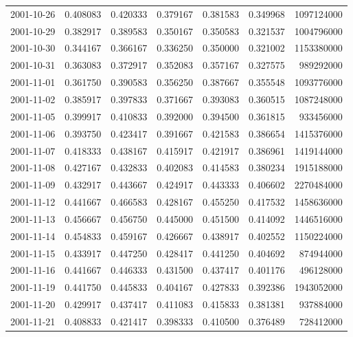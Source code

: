 \begin{tabular}{lrrrrrr}
2001-10-26 &    0.408083 &    0.420333 &    0.379167 &    0.381583 &    0.349968 &  1097124000 \\
2001-10-29 &    0.382917 &    0.389583 &    0.350167 &    0.350583 &    0.321537 &  1004796000 \\
2001-10-30 &    0.344167 &    0.366167 &    0.336250 &    0.350000 &    0.321002 &  1153380000 \\
2001-10-31 &    0.363083 &    0.372917 &    0.352083 &    0.357167 &    0.327575 &   989292000 \\
2001-11-01 &    0.361750 &    0.390583 &    0.356250 &    0.387667 &    0.355548 &  1093776000 \\
2001-11-02 &    0.385917 &    0.397833 &    0.371667 &    0.393083 &    0.360515 &  1087248000 \\
2001-11-05 &    0.399917 &    0.410833 &    0.392000 &    0.394500 &    0.361815 &   933456000 \\
2001-11-06 &    0.393750 &    0.423417 &    0.391667 &    0.421583 &    0.386654 &  1415376000 \\
2001-11-07 &    0.418333 &    0.438167 &    0.415917 &    0.421917 &    0.386961 &  1419144000 \\
2001-11-08 &    0.427167 &    0.432833 &    0.402083 &    0.414583 &    0.380234 &  1915188000 \\
2001-11-09 &    0.432917 &    0.443667 &    0.424917 &    0.443333 &    0.406602 &  2270484000 \\
2001-11-12 &    0.441667 &    0.466583 &    0.428167 &    0.455250 &    0.417532 &  1458636000 \\
2001-11-13 &    0.456667 &    0.456750 &    0.445000 &    0.451500 &    0.414092 &  1446516000 \\
2001-11-14 &    0.454833 &    0.459167 &    0.426667 &    0.438917 &    0.402552 &  1150224000 \\
2001-11-15 &    0.433917 &    0.447250 &    0.428417 &    0.441250 &    0.404692 &   874944000 \\
2001-11-16 &    0.441667 &    0.446333 &    0.431500 &    0.437417 &    0.401176 &   496128000 \\
2001-11-19 &    0.441750 &    0.445833 &    0.404167 &    0.427833 &    0.392386 &  1943052000 \\
2001-11-20 &    0.429917 &    0.437417 &    0.411083 &    0.415833 &    0.381381 &   937884000 \\
2001-11-21 &    0.408833 &    0.421417 &    0.398333 &    0.410500 &    0.376489 &   728412000 \\

\end{tabular}
